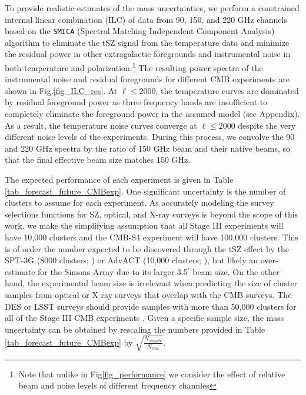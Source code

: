 To provide realistic estimates of the mass uncertainties, we perform a constrained internal linear combination (ILC) of data from 90, 150, and 220 GHz channels based on the \texttt{SMICA} (Spectral Matching Independent Component Analysis) algorithm \citep{cardoso08, planck14-09} to eliminate the tSZ signal from the temperature data and minimize the residual power in other extragalactic foregrounds and instrumental noise in both temperature and polarization.\footnote{Note that unlike in Fig\ref{fig_performance} we consider the effect of relative beam and noise levels of different frequency channles}
The resulting power spectra of the instrumental noise and residual foregrounds for different CMB experiments are shown in Fig.\ref{fig_ILC_res}.
At $\ell \le 2000$, the temperature curves are dominated by residual foreground power as three frequency bands are insufficient to completely eliminate the foreground power in the assumed model (see Appendix).
As a result, the temperature noise curves  converge at $\ell \le 2000$ despite the very different noise levels of the  experiments.
During this process, we convolve the 90 and 220 GHz spectra by the ratio of 150 GHz beam and their native beams, so that the final effective beam size matches 150 GHz.

The expected performance of each  experiment is given in Table \ref{tab_forecast_future_CMBexp}.
One significant uncertainty is the number of clusters to assume for each experiment.
As accurately modeling the survey selections functions for SZ, optical, and X-ray surveys is beyond the scope of this work, we make the simplifying assumption that all Stage III experiments will have 10,000 clusters and the CMB-S4 experiment will have 100,000 clusters.
This is of order the number expected to be discovered through the tSZ effect by the SPT-3G (8000 clusters; \citet{benson14}) or AdvACT (10,000 clusters; \citet{henderson16}), but likely an over-estimate for the Simons Array due to its larger 3.5$^\prime$ beam size.                                                                                                                                                      
On the other hand, the experimental beam size is irrelevant when predicting the size of cluster samples from optical or X-ray surveys that overlap with the CMB surveys.
The DES or LSST surveys should provide samples with more than 50,000 clusters for all of the Stage III CMB experiments \citep{rykoff16, lsst09}.
Given a specific sample size, the mass uncertainty can be obtained by rescaling the numbers provided in Table \ref{tab_forecast_future_CMBexp} by $\sqrt{\frac{N_{sample}}{N_{clus}}}$.

